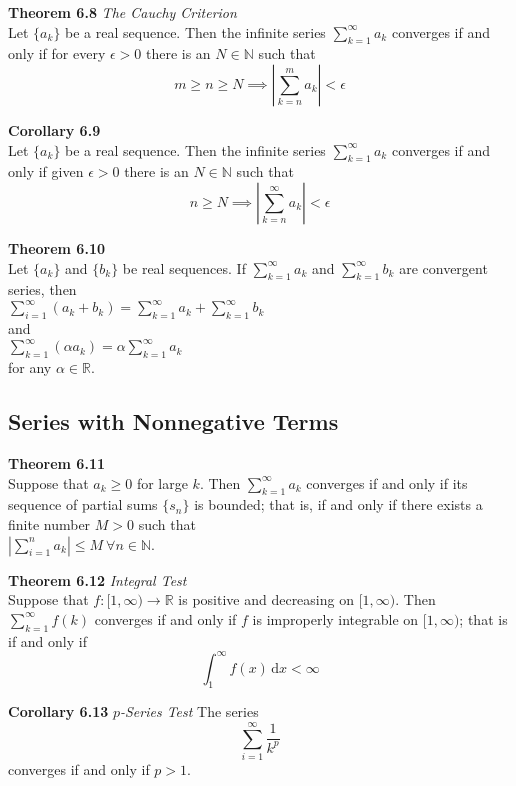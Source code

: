 \documentclass[8pt,landscape]{article}
\begin{document}
\begin{multicols}{3}
    \textbf{Theorem 6.8} \emph{The Cauchy Criterion} \\
    Let $\{a_k\}$ be a real sequence.
    Then the infinite series $\sum_{k=1}^\infty a_k$ converges if and only if for every
    $\epsilon > 0$ there is an $N \in \mathbb{N}$ such that
    \[
        m \geq n \geq N \implies \left| \sum_{k=n}^m a_k \right| < \epsilon
    \]

    \textbf{Corollary 6.9} \\
    Let $\{a_k\}$ be a real sequence.
    Then the infinite series $\sum_{k=1}^\infty a_k$ converges if and only if given
    $\epsilon > 0$ there is an $N \in \mathbb{N}$ such that
    \[
        n \geq N \implies \left| \sum_{k=n}^\infty a_k \right| < \epsilon
    \]

    \textbf{Theorem 6.10} \\
    Let $\{a_k\}$ and $\{b_k\}$ be real sequences.
    If $\sum_{k=1}^\infty a_k$ and $\sum_{k=1}^\infty b_k$ are convergent series, then \\
    $\sum_{i=1}^\infty (a_k + b_k) = \sum_{k=1}^\infty a_k + \sum_{k=1}^\infty b_k$ \\
    and \\
    $\sum_{k=1}^\infty (\alpha a_k) = \alpha \sum_{k=1}^\infty a_k$ \\
    for any $\alpha \in \mathbb{R}$.

    \subsection{Series with Nonnegative Terms}

    \textbf{Theorem 6.11} \\
    Suppose that $a_k \geq 0$ for large $k$.
    Then $\sum_{k=1}^\infty a_k$ converges if and only if its sequence of partial sums
    $\{s_n\}$ is bounded; that is, if and only if there exists a finite number $M > 0$
    such that \\
    $\left| \sum_{i=1}^n a_k \right| \leq M \ \forall n \in \mathbb{N}$.

    \textbf{Theorem 6.12} \emph{Integral Test} \\
    Suppose that $f : [1, \infty) \to \mathbb{R}$ is positive and decreasing on
    $[1, \infty)$.
    Then $\sum_{k=1}^\infty f(k)$ converges if and only if $f$ is improperly integrable
    on $[1, \infty)$; that is if and only if
    \[
        \int_1^\infty f(x)\, \mathrm{d}x < \infty
    \]

    \textbf{Corollary 6.13} \emph{$p$-Series Test}
    The series
    \[
        \sum_{i=1}^\infty \frac{1}{k^p}
    \]
    converges if and only if $p > 1$.


\end{multicols}
\end{document}

